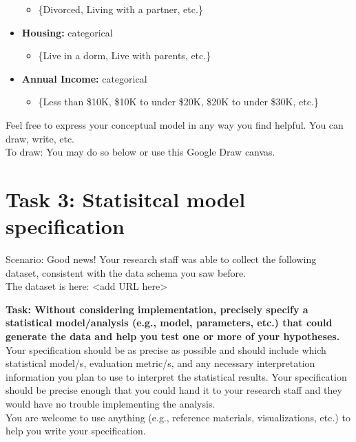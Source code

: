 \begin{itemize}
\begin{itemize}
        \item  \{Divorced, Living with a partner, etc.\}
    \end{itemize}
    \item \textbf{Housing:} categorical 
    \begin{itemize}
        \item  \{Live in a dorm, Live  with parents, etc.\}
    \end{itemize}
    \item \textbf{Annual Income:} categorical
    \begin{itemize}
        \item  \{Less than \$10K, \$10K to under \$20K, \$20K to under \$30K, etc.\}
    \end{itemize}
\end{itemize}

\hrulefill

Feel free to express your conceptual model in any way you find helpful. You can
draw, write, etc. \\

To draw: You may do so below or use this Google Draw canvas.	
\clearpage


\section{Task 3: Statisitcal model specification}
Scenario: Good news! Your research staff was able to collect the following
dataset, consistent with the data schema you saw before. \\

The dataset is here: <add URL here>\\

\hfill

\textbf{Task: Without considering implementation, precisely specify a statistical
model/analysis (e.g., model, parameters, etc.) that could generate the data and
help you test one or more of your hypotheses.} \\

Your specification should be as precise as possible and should include which
statistical model/s, evaluation metric/s, and any necessary interpretation
information you plan to use to interpret the statistical results. Your
specification should be precise enough that you could hand it to your research
staff and they would have no trouble implementing the analysis. \\

You are welcome to use anything (e.g., reference materials, visualizations,
etc.) to help you write your specification. \\

